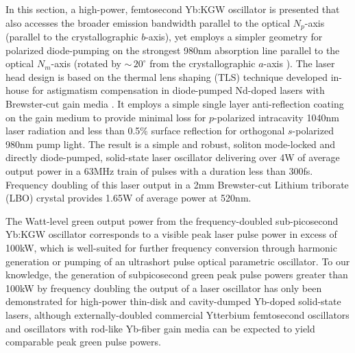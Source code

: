 In this section, a high-power, femtosecond Yb:KGW oscillator is presented that also accesses the broader emission bandwidth parallel to the optical $N_p$-axis (parallel to the crystallographic $b$-axis), yet employs a simpler geometry for polarized diode-pumping on the strongest 980nm absorption line parallel to the optical $N_m$-axis (rotated by $\sim\,20^\circ$ from the crystallographic $a$-axis \cite{Biswal_thermo_optical_05,mochalov_laser_1997,pujol_crystalline_1999}).
The laser head design is based on the thermal lens shaping (TLS) technique developed in-house for astigmatism compensation in diode-pumped Nd-doped lasers with Brewster-cut gain media \cite{Rimington_thermal_lens_2004}.
It employs a simple single layer  anti-reflection coating on the gain medium to provide minimal loss for $p$-polarized intracavity 1040nm laser radiation and less than 0.5\% surface reflection for orthogonal $s$-polarized 980nm pump light.
The result is a simple and robust, soliton mode-locked and directly diode-pumped, solid-state laser oscillator delivering over 4W of average output power in a 63MHz train of pulses with a duration less than 300fs.
Frequency doubling of this laser output in a 2mm Brewster-cut Lithium triborate (LBO) crystal provides 1.65W of average power at 520nm.

The Watt-level green output power from the frequency-doubled sub-picosecond Yb:KGW oscillator corresponds to a visible peak laser pulse power in excess of 100kW, which is well-suited for further frequency conversion through harmonic generation or pumping of an ultrashort pulse optical parametric oscillator.
To our knowledge, the generation of subpicosecond green peak pulse powers greater than 100kW by frequency doubling the output of a laser oscillator has only been demonstrated for high-power thin-disk \cite{Brunner_powerful_2004,Marchese_pulse_energy_06} and cavity-dumped \cite{Palmer_microjoule_07} Yb-doped solid-state lasers, although externally-doubled commercial Ytterbium femtosecond oscillators \cite{website_amplitude,website_solar,website_high_q,website_time_bandwidth} and oscillators with rod-like Yb-fiber gain media \cite{Ortac_pulse_2007} can be expected to yield comparable peak green pulse powers.

